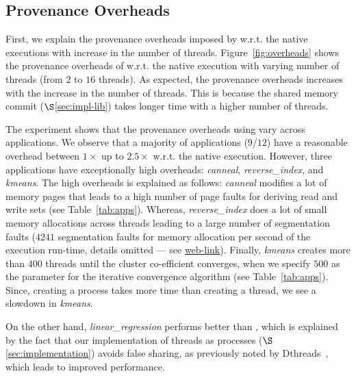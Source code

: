 


\subsection{Provenance Overheads}
\label{subsec:overheads}
First, we explain the provenance overheads imposed by \projecttitle w.r.t. the native \pthreads executions with increase in the number of threads. Figure~\ref{fig:overheads} shows the provenance overheads of \projecttitle w.r.t. the native \pthreads execution with varying number of
threads (from $2$ to $16$ threads). As expected, the provenance overheads increases with the increase in the number of threads. This is because the shared memory commit ($\S$\ref{sec:impl-lib}) takes longer time with a higher number of threads. 

The experiment shows that the provenance overheads using \projecttitle vary across applications. 
We observe that a majority of applications ($9$/$12$) have a reasonable overhead between $1\times$ up to $2.5\times$ w.r.t. the native execution. However, three applications have exceptionally high overheads:  {\em canneal}, {\em reverse\_index}, and {\em kmeans}. The high overheads is explained as follows: {\em canneal} modifies a lot of memory pages that leads to a high number of page faults for deriving read and write sets (see Table~\ref{tab:apps}). Whereas, {\em reverse\_index} does a lot of small memory allocations across threads leading to a large number of segmentation faults ($4241$ segmentation faults for memory allocation per second of the execution run-time, details omitted --- see  \href{https://mic92.github.io/inspector/index.html\#measurement_table}{web-link}).  Finally, {\em kmeans} creates more than $400$ threads until the cluster co-efficient converges, when we specify $500$ as the parameter for the iterative convergence algorithm (see Table~\ref{tab:apps}). Since, creating a process takes more time than creating a thread, we see a slowdown in {\em kmeans}.


On the other hand, {\em linear\_regression} performs better than \pthreads, which is explained by the fact that our implementation of threads as processes ($\S$\ref{sec:implementation})  avoids false sharing, as previously noted by Dthreads~\cite{dthreads-sosp-2011}, which leads to improved performance.



